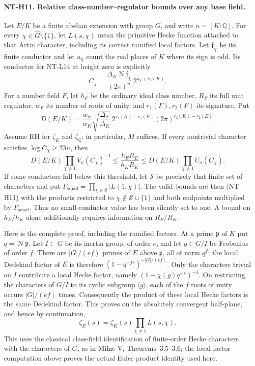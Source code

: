 \paragraph{NT-H11. Relative class-number--regulator bounds over any base field.}
Let $E/K$ be a finite abelian extension with group $G$, and
write $n=[K:\mathbb Q]$.
For every $\chi\in\widehat G\setminus\{1\}$, let
$L(s,\chi)$ mean the primitive Hecke function attached to that
Artin character, including its correct ramified local factors.
Let $\mathfrak f_\chi$ be its finite conductor and let
$a_\chi$ count the real places of $K$ where its sign is odd.
Its conductor for NT-L14 at height zero is explicitly
\[
 C_\chi=
 \frac{\Delta_K\operatorname N\mathfrak f_\chi}
                  {(2\pi)^n}\,2^{a_\chi+r_2(K)}.
\tag{NT-relative-conductor}
\]
For a number field $F$, let $h_F$ be the ordinary ideal class
number, $R_F$ its full unit regulator, $w_F$ its number of roots
of unity, and $r_1(F),r_2(F)$ its signature.  Put
\[
 D(E/K)=\frac{w_E}{w_K}
       \sqrt{\frac{\Delta_E}{\Delta_K}}\,
       2^{r_1(K)-r_1(E)}(2\pi)^{r_2(K)-r_2(E)}.
\]
Assume RH for $\zeta_E$ and $\zeta_{\mathbb Q}$; in particular,
$M$ suffices.  If every nontrivial character satisfies
$\log C_\chi\ge23n$, then
\[
 D(E/K)\prod_{\chi\ne1}V_n(C_\chi)^{-1}
 \le\frac{h_ER_E}{h_KR_K}
 \le D(E/K)\prod_{\chi\ne1}U_n(C_\chi).
\tag{NT-H11}
\]
If some conductors fall below this threshold, let
$\mathcal S$ be precisely that finite set of characters and
put $F_{\mathrm{small}}=\prod_{\chi\in\mathcal S}|L(1,\chi)|$.
The valid bounds are then (NT-H11) with the products restricted
to $\chi\notin\mathcal S\cup\{1\}$ and both endpoints
multiplied by $F_{\mathrm{small}}$.
Thus no small-conductor value has been silently set to one.
A bound on $h_E/h_K$ alone additionally requires information
on $R_E/R_K$.

Here is the complete proof, including the ramified factors.
At a prime $\mathfrak p$ of $K$ put $q=\operatorname N\mathfrak p$.
Let $I\subset G$ be its inertia group, of order $e$, and let
$g\in G/I$ be Frobenius of order $f$.
There are $|G|/(ef)$ primes of $E$ above $\mathfrak p$,
all of norm $q^f$; the local Dedekind factor of $E$ is therefore
$(1-q^{-fs})^{-|G|/(ef)}$.
Only the characters trivial on $I$ contribute a local Hecke
factor, namely $(1-\chi(g)q^{-s})^{-1}$.
On restricting the characters of $G/I$ to its cyclic subgroup
$\langle g\rangle$, each of the $f$ roots of unity occurs
$|G|/(ef)$ times.  Consequently the product of these local
Hecke factors is the same Dedekind factor.
This proves on the absolutely convergent half-plane, and hence
by continuation,
\[
 \zeta_E(s)=\zeta_K(s)\prod_{\chi\ne1}L(s,\chi).
\tag{NT-relative-factorization}
\]
This uses the classical class-field identification of finite-order
Hecke characters with the characters of $G$, as in Milne V,
Theorems~3.5--3.6; the local factor computation above proves
the actual Euler-product identity used here.

